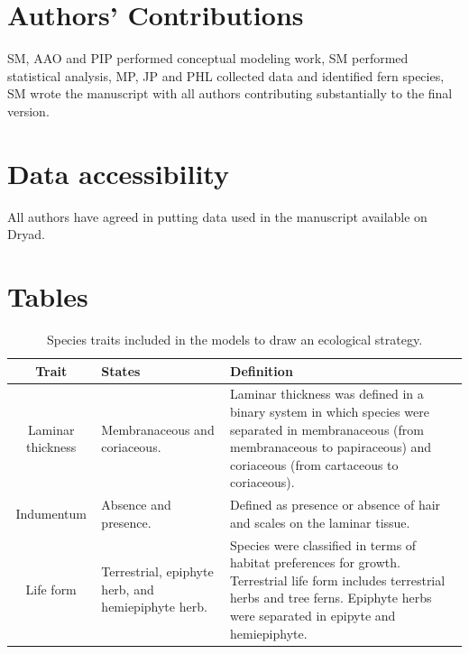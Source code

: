 \documentclass[12pt]{article}
\begin{document}
\section*{Authors' Contributions} 
SM, AAO and PIP performed conceptual modeling work, SM performed statistical analysis, MP, JP and PHL collected data and identified fern species, SM wrote the manuscript with all authors contributing substantially to the final version.

\section*{Data accessibility} 
All authors have agreed in putting data used in the manuscript available on Dryad.




\newpage 


\section*{Tables}


\begin{table}[!hb]
    \caption{ Species traits included in the models to draw an ecological strategy.}\label{trait}
  \begin{tabular}{cp{4cm}p{6cm}}
 \toprule	
\bf{Trait}	&	\bf{States}	&	\bf{Definition} 	\\
\hline
Laminar thickness	&	Membranaceous and coriaceous.	&	Laminar thickness was defined in a binary system in which species were separated in membranaceous (from membranaceous to papiraceous) and coriaceous (from cartaceous to coriaceous).	 \\
Indumentum	&	Absence and presence.	&	Defined as presence or absence of hair and scales on the laminar tissue.  \\
Life form	&	Terrestrial, epiphyte herb, and hemiepiphyte herb.	&	Species were classified in terms of habitat preferences for growth. Terrestrial life form includes terrestrial herbs and tree ferns. Epiphyte herbs were separated in epipyte and hemiepiphyte. \\
\bottomrule
\end{tabular}
\end{table}


\newpage
\end{document}
